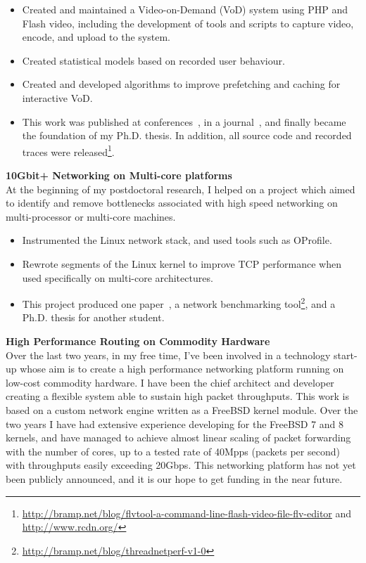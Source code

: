 \documentclass[letterpaper,10pt]{article}
\begin{document}
\begin{itemize}
 \item Created and maintained a Video-on-Demand (VoD) system using PHP and Flash video, including the development of tools and 
       scripts to capture video, encode, and upload to the system.
 \item Created statistical models based on recorded user behaviour.
 \item Created and developed algorithms to improve prefetching and caching for interactive VoD.
 \item This work was published at conferences~\cite{brampton2007cui,macquire2008acf}, in a journal~\cite{brampton2008cew}, and 
       finally became the foundation of my Ph.D. thesis. In addition, all source code and recorded traces were 
       released\footnote{\href{http://bramp.net/blog/flvtool-a-command-line-flash-video-file-flv-editor}{http://bramp.net/blog/flvtool-a-command-line-flash-video-file-flv-editor}
       and \href{http://www.rcdn.org/}{http://www.rcdn.org/}}.
\end{itemize}
\vspace{1em}

\textbf{10Gbit+ Networking on Multi-core platforms}\\
 At the beginning of my postdoctoral research, I helped on a project which aimed to identify and remove bottlenecks associated
 with high speed networking on multi-processor or multi-core machines.

\begin{itemize}
 \item Instrumented the Linux network stack, and used tools such as OProfile.
 \item Rewrote segments of the Linux kernel to improve TCP performance when used specifically on multi-core architectures.
 \item This project produced one paper~\cite{faulkner2009epn}, a network benchmarking tool\footnote{\href{http://bramp.net/blog/threadnetperf-v1-0}{http://bramp.net/blog/threadnetperf-v1-0}}, and a Ph.D. thesis for another student.
\end{itemize}
\vspace{1em}

\textbf{High Performance Routing on Commodity Hardware}\\
 Over the last two years, in my free time, I've been involved in a technology start-up whose aim is to create a high performance
 networking platform running on low-cost commodity hardware. I have been the chief architect and developer creating a flexible
 system able to sustain high packet throughputs. This work is based on a custom network engine written as a FreeBSD kernel module.
 Over the two years I have had extensive experience developing for the FreeBSD 7 and 8 kernels, and have managed to achieve almost
 linear scaling of packet forwarding with the number of cores, up to a tested rate of 40Mpps (packets per second) with throughputs
 easily exceeding 20Gbps. This networking platform has not yet been publicly announced, and it is our hope to get funding in the near future.
\vspace{1em}
\end{document}
